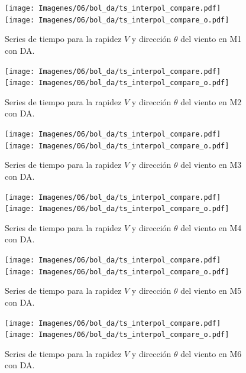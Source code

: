 \begin{figure}[H]
	\centering
	\texttt{[image: Imagenes/06/bol\_da/ts\_interpol\_compare.pdf]}\\%
	\texttt{[image: Imagenes/06/bol\_da/ts\_interpol\_compare\_o.pdf]}%
	\vspace{-2mm}\caption{Series de tiempo para la rapidez $V$ y dirección $\theta$ del viento en M1 con DA.}
	\label{fig:06_bol_da_ts_m1}
\end{figure}

\begin{figure}[H]
	\centering
	\texttt{[image: Imagenes/06/bol\_da/ts\_interpol\_compare.pdf]}\\%
	\texttt{[image: Imagenes/06/bol\_da/ts\_interpol\_compare\_o.pdf]}%
	\vspace{-2mm}\caption{Series de tiempo para la rapidez $V$ y dirección $\theta$ del viento en M2 con DA.}
	\label{fig:06_bol_da_ts_m2}
\end{figure}

\begin{figure}[H]
	\centering
	\texttt{[image: Imagenes/06/bol\_da/ts\_interpol\_compare.pdf]}\\%
	\texttt{[image: Imagenes/06/bol\_da/ts\_interpol\_compare\_o.pdf]}%
	\vspace{-2mm}\caption{Series de tiempo para la rapidez $V$ y dirección $\theta$ del viento en M3 con DA.}
	\label{fig:06_bol_da_ts_m3}
\end{figure}

\begin{figure}[H]
	\centering
	\texttt{[image: Imagenes/06/bol\_da/ts\_interpol\_compare.pdf]}\\%
	\texttt{[image: Imagenes/06/bol\_da/ts\_interpol\_compare\_o.pdf]}%
	\vspace{-2mm}\caption{Series de tiempo para la rapidez $V$ y dirección $\theta$ del viento en M4 con DA.}
	\label{fig:06_bol_da_ts_m4}
\end{figure}

\begin{figure}[H]
	\centering
	\texttt{[image: Imagenes/06/bol\_da/ts\_interpol\_compare.pdf]}\\%
	\texttt{[image: Imagenes/06/bol\_da/ts\_interpol\_compare\_o.pdf]}%
	\vspace{-2mm}\caption{Series de tiempo para la rapidez $V$ y dirección $\theta$ del viento en M5 con DA.}
	\label{fig:06_bol_da_ts_m5}
\end{figure}

\begin{figure}[H]
	\centering
	\texttt{[image: Imagenes/06/bol\_da/ts\_interpol\_compare.pdf]}\\%
	\texttt{[image: Imagenes/06/bol\_da/ts\_interpol\_compare\_o.pdf]}%
	\vspace{-2mm}\caption{Series de tiempo para la rapidez $V$ y dirección $\theta$ del viento en M6 con DA.}
	\label{fig:06_bol_da_ts_m6}
\end{figure}

